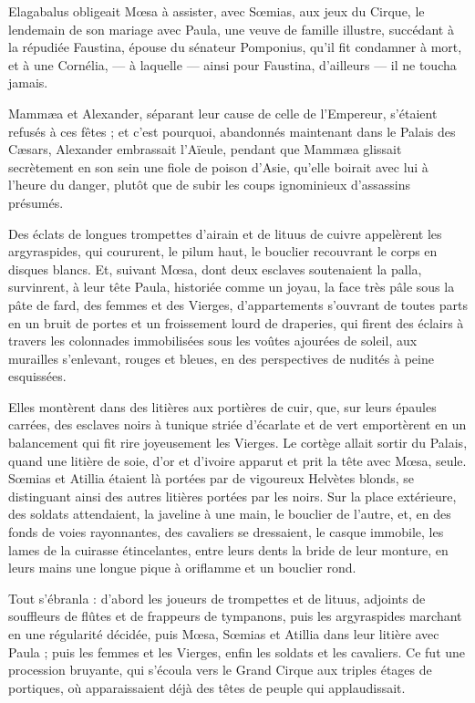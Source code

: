 \documentclass[a4paper, 11pt, oneside, polutonikogreek, french]{article}
\begin{document}
Elagabalus obligeait Mœsa à assister, avec Sœmias, aux jeux du Cirque, le lendemain de son mariage avec Paula, une veuve de famille illustre, succédant à la répudiée Faustina, épouse du sénateur Pomponius, qu'il fit condamner à mort, et à une Cornélia, --- à laquelle --- ainsi pour Faustina, d'ailleurs --- il ne toucha jamais.

Mammæa et Alexander, séparant leur cause de celle de l’Empereur, s'étaient refusés à ces fêtes ; et c'est pourquoi, abandonnés maintenant dans le Palais des Cæsars, Alexander embrassait l'Aïeule, pendant que Mammæa glissait secrètement en son sein une fiole de poison d'Asie, qu'elle boirait avec lui à l'heure du danger, plutôt que de subir les coups ignominieux d'assassins présumés.

Des éclats de longues trompettes d'airain et de lituus de cuivre appelèrent les argyraspides, qui coururent, le pilum haut, le bouclier recouvrant le corps en disques blancs. Et, suivant Mœsa, dont deux esclaves soutenaient la palla, survinrent, à leur tête Paula, historiée comme un joyau, la face très pâle sous la pâte de fard, des femmes et des Vierges, d'appartements s'ouvrant de toutes parts en un bruit de portes et un froissement lourd de draperies, qui firent des éclairs à travers les colonnades immobilisées sous les voûtes ajourées de soleil, aux murailles s’enlevant, rouges et bleues, en des perspectives de nudités à peine esquissées.

Elles montèrent dans des litières aux portières de cuir, que, sur leurs épaules carrées, des esclaves noirs à tunique striée d'écarlate et de vert emportèrent en un balancement qui fit rire joyeusement les Vierges. Le cortège allait sortir du Palais, quand une litière de soie, d'or et d'ivoire apparut et prit la tête avec Mœsa, seule. Sœmias et Atillia étaient là portées par de vigoureux Helvètes blonds, se distinguant ainsi des autres litières portées par les noirs. Sur la place extérieure, des soldats attendaient, la javeline à une main, le bouclier de l'autre, et, en des fonds de voies rayonnantes, des cavaliers se dressaient, le casque immobile, les lames de la cuirasse étincelantes, entre leurs dents la bride de leur monture, en leurs mains une longue pique à oriflamme et un bouclier rond.

Tout s'ébranla : d'abord les joueurs de trompettes et de lituus, adjoints de souffleurs de flûtes et de frappeurs de tympanons, puis les argyraspides marchant en une régularité décidée, puis Mœsa, Sœmias et Atillia dans leur litière avec Paula ; puis les femmes et les Vierges, enfin les soldats et les cavaliers. Ce fut une procession bruyante, qui s'écoula vers le Grand Cirque aux triples étages de portiques, où apparaissaient déjà des têtes de peuple qui applaudissait.
\end{document}
